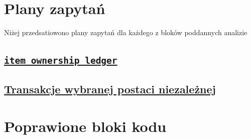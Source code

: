 \documentclass[11pt]{article}
\begin{document}
\section{Plany zapytań}
\label{sec:orgdba5965}
Niżej przedsatiowono plany zapytań dla każdego z bloków poddannych analizie

\subsection{\hyperref[sec:org340c0bf]{\texttt{item\_ownership\_ledger}}}
\label{sec:org0d9fc06}

\subsection{\hyperref[sec:org134c64a]{Transakcje wybranej postaci niezależnej}}
\label{sec:org3425251}

\section{Poprawione bloki kodu}
\label{sec:org7c9efcd}
\end{document}
